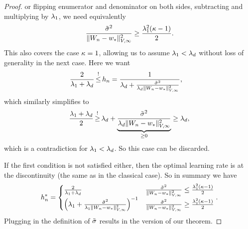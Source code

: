 \begin{proof}
	or flipping enumerator and denominator on both sides, subtracting and
	multiplying by \(\lambda_1\), we need equivalently
	\begin{align*}
		\frac{\tilde{\sigma}^2}{
			\|W_n-w_*\|_{V,\infty}^2
		}
		\ge\frac{\lambda_1^2(\kappa-1)}{2}.
	\end{align*}
	This also covers the case \(\kappa=1\), allowing us to assume
	\(\lambda_1 < \lambda_d\) without loss of generality in the next
	case. Here we want 
	\begin{align*}
		\frac{2}{\hesseEV_1+\hesseEV_\dimension} \xle{!} \lr_n
		&= \frac{1}{
			\hesseEV_\dimension
			+ \frac{\tilde{\stdBound}^2}{
				\hesseEV_\dimension\|\Weights_n-\minimum\|_{V,\infty}^2
			}
		},
	\end{align*}
	which similarly simplifies to
	\begin{align*}
		\frac{\hesseEV_1+\hesseEV_\dimension}{2}
		\xge{!} \hesseEV_\dimension
		+ \underbrace{\frac{\tilde{\stdBound}^2}{
			\hesseEV_\dimension\|\Weights_n-\minimum\|_{V,\infty}^2
		}}_{\ge 0}
		\ge \hesseEV_\dimension,
	\end{align*}
	which is a contradiction for \(\lambda_1 < \lambda_d\). So this
	case can be discarded.

	If the first condition is not satisfied either, then the optimal learning
	rate is at the discontinuity (the same as in the classical case). So in
	summary we have
	\begin{align*}
		h_n^* = \begin{cases}
			\frac{2}{\lambda_1+\lambda_d}
			&\frac{\tilde{\sigma}^2}{
				\|W_n-w_*\|_{V,\infty}^2
			}
			\le \frac{\lambda_1^2(\kappa-1)}{2}\\
			\left(
				\lambda_1 + \frac{\tilde{\sigma}^2}{
					\lambda_1\|W_n-w_*\|_{V,\infty}^2
				}
			\right)^{-1}
			&\frac{\tilde{\sigma}^2}{
				\|W_n-w_*\|_{V,\infty}^2
			}
			\ge \frac{\lambda_1^2(\kappa-1)}{2}
		\end{cases}.
	\end{align*}
	Plugging in the definition of \(\tilde{\sigma}\) results in the version
	of our theorem.


\end{proof}
